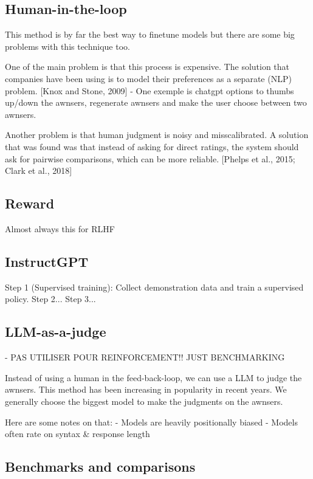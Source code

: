 \documentclass{article}
\begin{document}
\subsection{Human-in-the-loop}

This method is by far the best way to finetune models but there are some big problems with this technique too.

One of the main problem is that this process is expensive. The solution that companies have been using is to model their preferences as a separate (NLP) problem. [Knox and Stone, 2009]
- One exemple is chatgpt options to thumbs up/down the awnsers, regenerate awnsers and make the user choose between two awnsers.

Another problem is that human judgment is noisy and misscalibrated. A solution that was found was that instead of asking for direct ratings, the system should ask for pairwise comparisons, which can be more reliable. [Phelps et al., 2015; Clark et al., 2018]

\subsection{Reward }
Almost always this for RLHF

\subsection{InstructGPT}
Step 1 (Supervised training): Collect demonstration data and train a supervised policy.
Step 2... 
Step 3...

\subsection{LLM-as-a-judge}

- PAS UTILISER POUR REINFORCEMENT!! JUST BENCHMARKING

Instead of using a human in the feed-back-loop, we can use a LLM to judge the awnsers. This method has been increasing in popularity in recent years. We generally choose the biggest model to make the judgments on the awnsers.

Here are some notes on that:
- Models are heavily positionally biased
- Models often rate on syntax & response length

\subsection{Benchmarks and comparisons}
\end{document}
